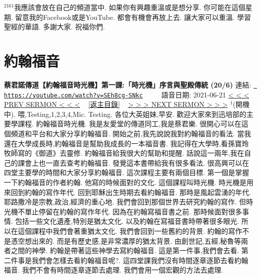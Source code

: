 \documentclass{book}
\begin{document}
$^{2161}$我應該會放在自己的頻道當中.
如果你有興趣重溫或是想分享.
你可能在這個星期.
留意我的Facebook或是YouTube.
都會有機會再放上去.
讓大家可以重溫.
學習聖經的華語.
多謝大家.
祝福你們.
\newpage



\section{約翰福音}
\label{sec:SEh8cg_SNkc}
\textbf{蔡君諾傳道【約翰福音時光機】第一課:「時光機」序言與聖殿傳統 (20/6)}
\newline
\newline
連結: \href{https://youtube.com/watch?v=SEh8cg-SNkc}{\texttt{ https://youtube.com/watch?v=SEh8cg-SNkc}} ~~~~ 語音日期: 2021-06-21 
\newline
\newline
\hyperref[sec:LLLLLQ816Zs]{\small{< < < PREV SERMON < < <}}
~
\hyperref[sec:index]{\small{[返主目錄]}}
~
\hyperref[sec:V9Yc8B3k4jI]{\small{> > > NEXT SERMON > > >}}
\newline
\newline
$^{1}$(開機中).
喂,Testing,1,2,3,4,Mic.
Testing.
各位大英姐妹,早安.
歡迎大家來到迅培部的主要學課程.
約翰福音時光機.
我是友愛堂的傳道同工,我是蔡君樂.
很開心可以在這個頻道和平台和大家分享約翰福音.
開始之前,我先說說我對約翰福音的看法.
當我還在大學成長時,約翰福音是幫助我成長的一本福音書.
我記得在大學時,看孫寶玲牧師寫的《御道》去靈修.
約翰福音給我很大的幫助和提醒.
話說這一兩年,我在自己的課會上也一直去查考約翰福音.
發覺這本書帶給我有很多看法.
很高興可以在四堂主要學的時間和大家分享約翰福音.
這次課程主要有兩個目標.
第一個是掌握一下約翰福音的作者約翰.
他寫的時候面對的文化.
這個課程叫時光機.
時光機是用來回到約翰的寫作年代.
回到耶穌出生時期去看約翰福音.
那時是風起雲湧的年代.
耶路撒冷是宗教,政治,經濟的重心地.
我們會回到那個世界去研究約翰的寫作.
但時光機不單止停留在約翰的寫作年代.
因為在約翰寫福音書之前.
那時候面對很多事情.
包括一些文化遺產,特別是猶太文化.
以及約翰在寫福音書時帶著很多眼光.
所以在這個課程中我們會著重猶太文化.
我們會回到一些舊約的背景.
約翰的寫作不是憑空想出來的.
而是有歷史感,是非常濃厚的猶太背景.
由創世記,五經,秘魯等兩者之間的神學.
約翰是帶著這些神學去寫約翰福音.
這是第一件事,我們會去看.
第二件事是我們會怎樣去看約翰福音呢?.
這四堂課我們沒有時間逐章逐節去看約翰福音.
我們不會有時間逐章逐節去處理.
我們會用一個宏觀的方法去處理.
\end{document}
